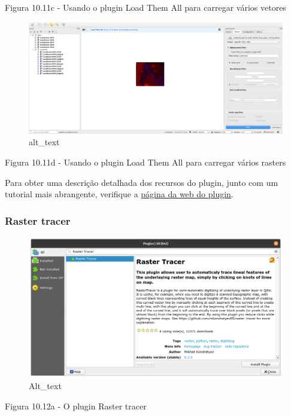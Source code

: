 \documentclass[
]{book}
\begin{document}
Figura 10.11c - Usando o plugin Load Them All para carregar vários vetores

\begin{figure}
\centering
\includegraphics{media/modulo10/fig1011_d.png}
\caption{alt\_text}
\end{figure}

Figura 10.11d - Usando o plugin Load Them All para carregar vários rasters

Para obter uma descrição detalhada dos recursos do plugin, junto com um tutorial mais abrangente, verifique a \href{https://github.com/gacarrillor/loadthemall}{página da web do plugin}.

\hypertarget{raster-tracer}{%
\subsubsection{\texorpdfstring{\textbf{Raster tracer}}{Raster tracer}}\label{raster-tracer}}

\begin{figure}
\centering
\includegraphics{media/modulo10/fig1012_a.png}
\caption{Alt\_text}
\end{figure}

Figura 10.12a - O plugin Raster tracer
\end{document}
